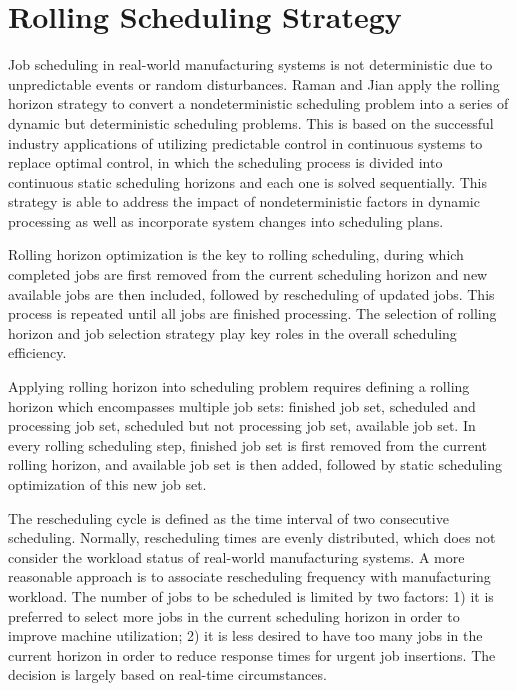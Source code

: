 \section{Rolling Scheduling Strategy}
Job scheduling in real-world manufacturing systems is not deterministic due to unpredictable events or random disturbances.
Raman \citep{raman19933} and Jian\citep{jian19972} apply the rolling horizon strategy to convert a nondeterministic scheduling problem into a series of dynamic but deterministic scheduling problems.
This is based on the successful industry applications of utilizing predictable control in continuous systems to replace optimal control, in which the scheduling process is divided into continuous static scheduling horizons and each one is solved sequentially.
This strategy is able to address the impact of nondeterministic factors in dynamic processing as well as incorporate system changes into scheduling plans.

Rolling horizon optimization is the key to rolling scheduling, during which completed jobs are first removed from the current scheduling horizon and new available jobs are then included, followed by rescheduling of updated jobs. 
This process is repeated until all jobs are finished processing.
The selection of rolling horizon and job selection strategy play key roles in the overall scheduling efficiency.

Applying rolling horizon into scheduling problem requires defining a rolling horizon which encompasses multiple job sets: finished job set, scheduled and processing job set, scheduled but not processing job set, available job set.
In every rolling scheduling step, finished job set is first removed from the current rolling horizon, and available job set is then added, followed by static scheduling optimization of this new job set.

The rescheduling cycle is defined as the time interval of two consecutive scheduling.
Normally, rescheduling times are evenly distributed, which does not consider the workload status of real-world manufacturing systems.
A more reasonable approach is to associate rescheduling frequency with manufacturing workload.
The number of jobs to be scheduled is limited by two factors: 1) it is preferred to select more jobs in the current scheduling horizon in order to improve machine utilization; 2) it is less desired to have too many jobs in the current horizon in order to reduce response times for urgent job insertions.
The decision is largely based on real-time circumstances.

